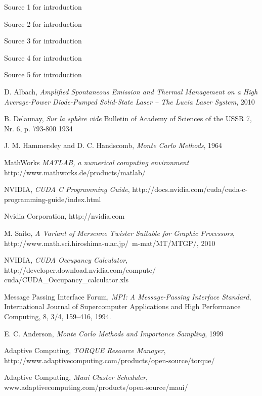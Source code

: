 \begin{thebibliography}{9}

    Source 1 for introduction

    Source 2 for introduction

    Source 3 for introduction

    Source 4 for introduction

    Source 5 for introduction

    D. Albach,
    \emph{Amplified Spontaneous Emission and Thermal Management on a High Average-Power Diode-Pumped Solid-State Laser \--- The Lucia Laser System},
    2010

    B. Delaunay,
    \emph{Sur la sphère vide}
    Bulletin of Academy of Sciences of the USSR 7,
    Nr. 6,
    p. 793-800
    1934

    J. M. Hammersley and D. C. Handscomb,
    \emph{Monte Carlo Methods},
    1964

    MathWorks
    \emph{MATLAB, a numerical computing environment}
    http://www.mathworks.de/products/matlab/

    NVIDIA,
    \emph{CUDA C Programming Guide},
    http://docs.nvidia.com/cuda/cuda-c-programming-guide/index.html

    Nvidia Corporation,
    http://nvidia.com

    M. Saito,
    \emph{A Variant of Mersenne Twister Suitable for Graphic Processors},
    http://www.math.sci.hiroshima-u.ac.jp/~m-mat/MT/MTGP/,
    2010

    NVIDIA,
    \emph{CUDA Occupancy Calculator},
    http://developer.download.nvidia.com/compute/ cuda/CUDA\_Occupancy\_calculator.xls

    Message Passing Interface Forum,
    \emph{MPI: A Message-Passing Interface Standard}, 
    International Journal of Supercomputer Applications and High Performance Computing,
    8, 3/4, 159–416, 1994.

    E. C. Anderson,
    \emph{Monte Carlo Methods and Importance Sampling},
    1999

    Adaptive Computing,
    \emph{TORQUE Resource Manager},
    http://www.adaptivecomputing.com/products/open-source/torque/

    Adaptive Computing,
    \emph{Maui Cluster Scheduler},
    www.adaptivecomputing.com/products/open-source/maui/




\end{thebibliography}
